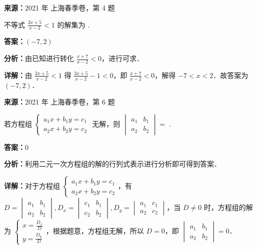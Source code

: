 \begin{question}[points=4]
\textbf{来源：}2021 年 上海春季卷，第 4 题\par
不等式 $\frac{2x+5}{x-2}<1$ 的解集为  .
\fillin[{$(-7,2)$}]
\begin{solution}
\textbf{答案：}$(-7,2)$

\textbf{分析：}由已知进行转化 $\frac{x+7}{x-2}<0$，进行可求．

\textbf{详解：}由 $\frac{2x+5}{x-2}<1$ 得 $\frac{2x+5}{x-2}-1<0$，即 $\frac{x+7}{x-2}<0$，解得 $-7<x<2$．故答案为 $(-7,2)$．
\end{solution}
\end{question}

\begin{question}[points=4]
\textbf{来源：}2021 年 上海春季卷，第 6 题\par
若方程组 $\begin{cases} a_1x+b_1y=c_1 \\ a_2x+b_2y=c_2 \end{cases}$ 无解，则 $\begin{vmatrix} a_1 & b_1 \\ a_2 & b_2 \end{vmatrix}=$  .
\fillin[{$0$}]
\begin{solution}
\textbf{答案：}$0$

\textbf{分析：}利用二元一次方程组的解的行列式表示进行分析即可得到答案．

\textbf{详解：}对于方程组 $\begin{cases} a_1x+b_1y=c_1 \\ a_2x+b_2y=c_2 \end{cases}$，有 $D=\begin{vmatrix} a_1 & b_1 \\ a_2 & b_2 \end{vmatrix}, D_x=\begin{vmatrix} c_1 & b_1 \\ c_2 & b_2 \end{vmatrix}, D_y=\begin{vmatrix} a_1 & c_1 \\ a_2 & c_2 \end{vmatrix}$，当 $D\neq 0$ 时，方程组的解为 $\begin{cases} x=\frac{D_x}{D} \\ y=\frac{D_y}{D} \end{cases}$，根据题意，方程组无解，所以 $D=0$，即 $\begin{vmatrix} a_1 & b_1 \\ a_2 & b_2 \end{vmatrix}=0$．
\end{solution}
\end{question}

